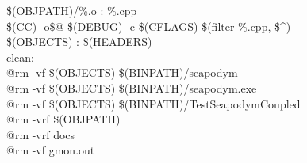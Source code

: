 \noindent \$(OBJPATH)/\%.o : \%.cpp \\
        \$(CC) -o\$@ \$(DEBUG) -c \$(CFLAGS) \$(filter \%.cpp, \$\textbf{\^}) \\

\noindent \$(OBJECTS) : \$(HEADERS) \\

\noindent clean: \\        \indent @rm -vf \$(OBJECTS) \$(BINPATH)/seapodym \\
        \indent @rm -vf \$(OBJECTS) \$(BINPATH)/seapodym.exe \\
        \indent @rm -vf \$(OBJECTS) \$(BINPATH)/TestSeapodymCoupled \\
        \indent @rm -vrf \$(OBJPATH) \\
        \indent @rm -vrf docs \\
        \indent @rm -vf gmon.out \\

